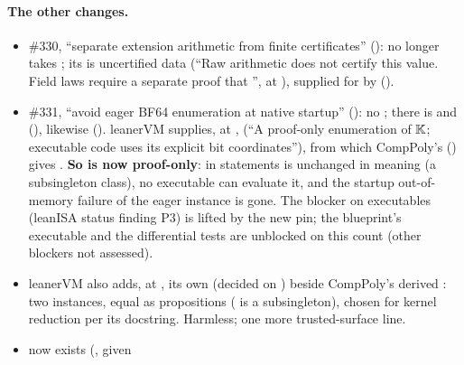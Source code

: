 \paragraph{The other changes.}
\begin{itemize}
\item \#330, \enquote{separate extension arithmetic from finite certificates} ():
   no longer takes \lean{[Fintype F]}; its  is uncertified data
  (\enquote{Raw arithmetic does not certify this value. Field laws require a separate proof that
  }, \allowbreak{}\allowbreak{}\allowbreak{} at
  ), supplied for  by
  \allowbreak{}\allowbreak{}\allowbreak{}\allowbreak{}
  ().
\item \#331, \enquote{avoid eager BF64 enumeration at native startup} (): no
  ; there is  and
  \allowbreak{}\allowbreak{} (),
  likewise  (). leanerVM supplies, at
  , \allowbreak{} (\enquote{A
  proof-only enumeration of $\mathbb{K}$; executable code uses its explicit bit coordinates}), from which
  CompPoly's \allowbreak{} (\allowbreak{}) gives
  . \textbf{So  is now proof-only}:  in
  statements is unchanged in meaning (a subsingleton class), no executable can evaluate it, and
  the startup out-of-memory failure of the eager instance is gone. The blocker on executables
  (leanISA status finding P3) is lifted by the new pin; the blueprint's executable 
  and the differential tests are unblocked on this count (other blockers not assessed).
\item leanerVM also adds, at , its own  (decided on
  ) beside CompPoly's derived : two instances, equal as
  propositions ( is a subsingleton), chosen for kernel reduction per its
  docstring. Harmless; one more trusted-surface line.
\item {} now exists (\allowbreak{}, given

\end{itemize}
